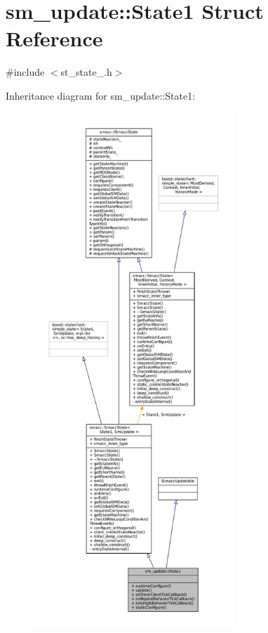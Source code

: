 \hypertarget{structsm__update_1_1State1}{}\section{sm\+\_\+update\+:\+:State1 Struct Reference}
\label{structsm__update_1_1State1}


{\ttfamily \#include $<$st\+\_\+state\+\_.\+h$>$}



Inheritance diagram for sm\+\_\+update\+:\+:State1\+:
\nopagebreak
\begin{figure}[H]
\begin{center}
\leavevmode
\includegraphics[height=550pt]{structsm__update_1_1State1__inherit__graph}
\end{center}
\end{figure}


